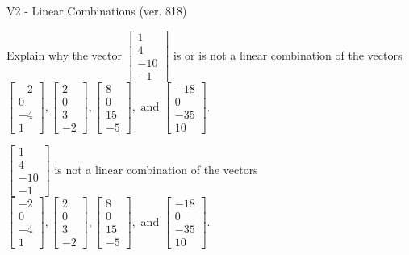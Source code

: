 \begin{exercise}
  \begin{exerciseTitle}V2 - Linear Combinations (ver. 818)\end{exerciseTitle}
  \begin{exerciseStatement}
    Explain why the vector \(\left[\begin{array}{c}
1 \\
4 \\
-10 \\
-1
\end{array}\right]\)  is or is not a linear 
	combination of the vectors \(\left[\begin{array}{c}
-2 \\
0 \\
-4 \\
1
\end{array}\right] , \left[\begin{array}{c}
2 \\
0 \\
3 \\
-2
\end{array}\right] , \left[\begin{array}{c}
8 \\
0 \\
15 \\
-5
\end{array}\right] , \text{ and } \left[\begin{array}{c}
-18 \\
0 \\
-35 \\
10
\end{array}\right]\).
	


  \end{exerciseStatement}
  \begin{exerciseAnswer}
   \(\left[\begin{array}{c}
1 \\
4 \\
-10 \\
-1
\end{array}\right]\) 
  	 is not  
	a linear combination of the vectors \(\left[\begin{array}{c}
-2 \\
0 \\
-4 \\
1
\end{array}\right] , \left[\begin{array}{c}
2 \\
0 \\
3 \\
-2
\end{array}\right] , \left[\begin{array}{c}
8 \\
0 \\
15 \\
-5
\end{array}\right] , \text{ and } \left[\begin{array}{c}
-18 \\
0 \\
-35 \\
10
\end{array}\right]\).


\end{exerciseAnswer}
\end{exercise}
